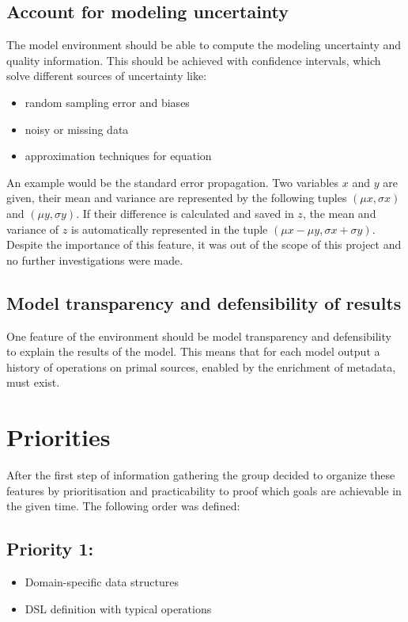 \subsection{Account for modeling uncertainty}
\par
The model environment should be able to compute the modeling uncertainty and quality information. This should be achieved with confidence intervals, which solve different sources of uncertainty like:
\begin{itemize}
	\item random sampling error and biases
	\item noisy or missing data
	\item approximation techniques for equation
\end{itemize}
\par
An example would be the standard error propagation. Two variables $x$ and $y$ are given, their mean and variance are represented by the following tuples $(\mu x , \sigma x )$ and $(\mu y , \sigma y )$. If their difference is calculated and saved in $z$, the mean and variance of $z$ is automatically represented in the tuple  $(\mu x - \mu y , \sigma x + \sigma y)$.
\\
Despite the importance of this feature, it was out of the scope of this project and no further investigations were made.

\subsection{Model transparency and defensibility of results}
One feature of the environment should be model transparency and defensibility  to explain the results of the model. This means that for each model output a history of operations on primal sources, enabled by the enrichment of metadata, must exist.

\section{Priorities}
\par
After the first step of information gathering the group decided to organize these features by prioritisation and practicability to proof which goals are achievable in the given time.  
The following order was defined:
\subsection*{Priority 1:}
\begin{itemize}
	\item Domain-specific data structures
	\item DSL definition with typical operations
\end{itemize}
